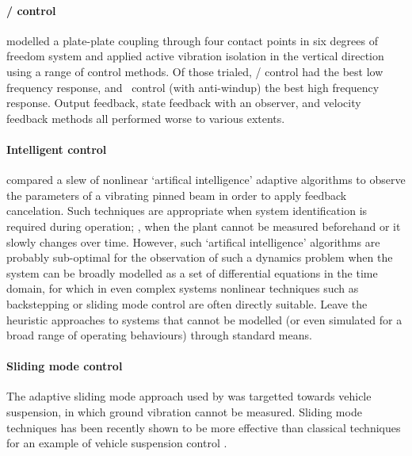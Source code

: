 \paragraph{\Hinf/ control}

\textcite{kerber2007} modelled a plate-plate coupling through four contact points in six degrees of freedom system and applied active vibration isolation in the vertical direction using a range of control methods.
Of those trialed, \Hinf/ control had the best low frequency response, and \PI\ control (with anti-windup) the best high frequency response.
Output feedback, state feedback with an observer, and velocity feedback methods all performed worse to various extents.

\paragraph{Intelligent control}

\textcite{madkour2007} compared a slew of nonlinear `artifical intelligence' adaptive algorithms to observe the parameters of a vibrating pinned beam in order to apply feedback cancelation.
Such techniques are appropriate when system identification is required during operation; \ie, when the plant cannot be measured beforehand or it slowly changes over time.
However, such `artifical intelligence' algorithms are probably sub-optimal for the observation of such a dynamics problem when the system can be broadly modelled as a set of differential equations in the time domain, for which in even complex systems nonlinear techniques such as backstepping or sliding mode control are often directly suitable.
Leave the heuristic approaches to systems that cannot be modelled (or even simulated for a broad range of operating behaviours) through standard means.

\paragraph{Sliding mode control}

The adaptive sliding mode approach used by \textcite{zuo2004} was targetted towards vehicle suspension, in which ground vibration cannot be measured.
Sliding mode techniques has been recently shown to be more effective than classical techniques for an example of vehicle suspension control \cite{dong2009}.


